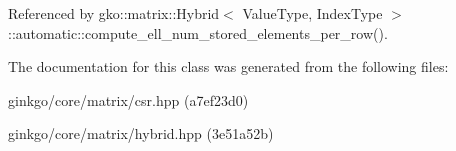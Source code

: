 Referenced by gko\+::matrix\+::\+Hybrid$<$ Value\+Type, Index\+Type $>$\+::automatic\+::compute\+\_\+ell\+\_\+num\+\_\+stored\+\_\+elements\+\_\+per\+\_\+row().



The documentation for this class was generated from the following files\+:\begin{DoxyCompactItemize}
\item 
ginkgo/core/matrix/csr.\+hpp (a7ef23d0)\item 
ginkgo/core/matrix/hybrid.\+hpp (3e51a52b)\end{DoxyCompactItemize}
